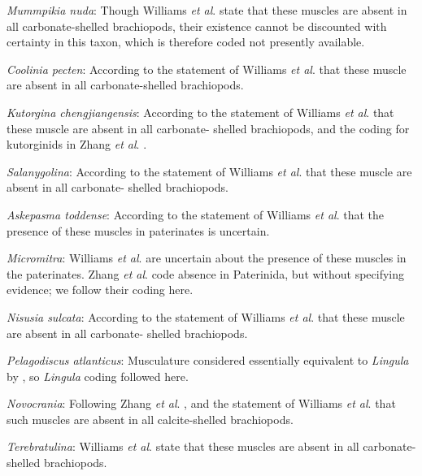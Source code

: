 \documentclass[]{book}
\theoremstyle{definition}
\theoremstyle{definition}
\theoremstyle{definition}
\theoremstyle{remark}
\begin{document}
\emph{Mummpikia nuda}: Though Williams \emph{et al}.
\citeyearpar[P.32]{Williams2000BrachiopodaLinguliformea} state that
these muscles are absent in all carbonate-shelled brachiopods, their
existence cannot be discounted with certainty in this taxon, which is
therefore coded not presently available.

\emph{Coolinia pecten}: According to the statement of Williams \emph{et
al}. \citeyearpar[P.32]{Williams2000BrachiopodaLinguliformea} that these
muscle are absent in all carbonate-shelled brachiopods.

\emph{Kutorgina chengjiangensis}: According to the statement of Williams
\emph{et al}. \citeyearpar[P.32]{Williams2000BrachiopodaLinguliformea}
that these muscle are absent in all carbonate- shelled brachiopods, and
the coding for kutorginids in Zhang \emph{et al}.
\citeyearpar{Zhang2014Anearly}.

\emph{Salanygolina}: According to the statement of Williams \emph{et
al}. \citeyearpar[P.32]{Williams2000BrachiopodaLinguliformea} that these
muscle are absent in all carbonate- shelled brachiopods.

\emph{Askepasma toddense}: According to the statement of Williams
\emph{et al}. \citeyearpar[P.32]{Williams2000BrachiopodaLinguliformea}
that the presence of these muscles in paterinates is uncertain.

\emph{Micromitra}: Williams \emph{et al}.
\citeyearpar[P.32]{Williams2000BrachiopodaLinguliformea} are uncertain
about the presence of these muscles in the paterinates. Zhang \emph{et
al}. \citeyearpar{Zhang2014Anearly} code absence in Paterinida, but
without specifying evidence; we follow their coding here.

\emph{Nisusia sulcata}: According to the statement of Williams \emph{et
al}. \citeyearpar[P.32]{Williams2000BrachiopodaLinguliformea} that these
muscle are absent in all carbonate- shelled brachiopods.

\emph{Pelagodiscus atlanticus}: Musculature considered essentially
equivalent to \emph{Lingula} by
\citet{Williams2000BrachiopodaLinguliformea}, so \emph{Lingula} coding
followed here.

\emph{Novocrania}: Following Zhang \emph{et al}.
\citeyearpar{Zhang2014Anearly}, and the statement of Williams \emph{et
al}. \citeyearpar{Williams2000BrachiopodaLinguliformea} that such
muscles are absent in all calcite-shelled brachiopods.

\emph{Terebratulina}: Williams \emph{et al}.
\citeyearpar[P.32]{Williams2000BrachiopodaLinguliformea} state that
these muscles are absent in all carbonate-shelled brachiopods.
\end{document}
